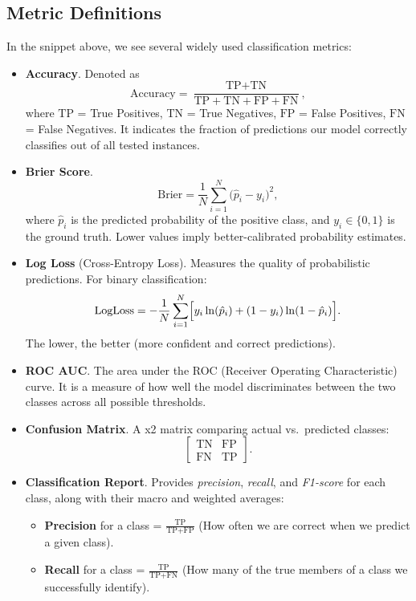 \documentclass[12pt]{article}
\begin{document}
\subsection{Metric Definitions}
In the snippet above, we see several widely used classification metrics:

\begin{itemize}
\item \textbf{Accuracy}. Denoted as
\[
\text{Accuracy} = \frac{\text{TP} + \text{TN}}{\text{TP} + \text{TN} + \text{FP} + \text{FN}},
\]
where \(\text{TP}\) = True Positives, \(\text{TN}\) = True Negatives, \(\text{FP}\) = False Positives, \(\text{FN}\) = False Negatives. It indicates the fraction of predictions our model correctly classifies out of all tested instances.
\item \textbf{Brier Score}. 
\[
\text{Brier} = \frac{1}{N} \sum_{i=1}^N \bigl(\hat{p}_i - y_i\bigr)^2,
\]
where \(\hat{p}_i\) is the predicted probability of the positive class, and \(y_i \in \{0,1\}\) is the ground truth. Lower values imply better-calibrated probability estimates. 
\item \textbf{Log Loss} (Cross-Entropy Loss). Measures the quality of probabilistic predictions. For binary classification:
\[
\text{LogLoss} = -\frac{1}{N}\sum_{i=1}^N \Bigl[y_i\ln(\hat{p}_i) + (1-y_i)\ln(1-\hat{p}_i)\Bigr].
\]
The lower, the better (more confident and correct predictions).
\item \textbf{ROC AUC}. The area under the ROC (Receiver Operating Characteristic) curve. It is a measure of how well the model discriminates between the two classes across all possible thresholds. 
\item \textbf{Confusion Matrix}. A \2x2 matrix comparing actual vs.\ predicted classes: 
\[
\begin{bmatrix}
\text{TN} & \text{FP}\\
\text{FN} & \text{TP}
\end{bmatrix}.
\]
\item \textbf{Classification Report}. Provides \emph{precision}, \emph{recall}, and \emph{F1-score} for each class, along with their macro and weighted averages:
  \begin{itemize}
    \item \textbf{Precision} for a class = 
    \(\frac{\text{TP}}{\text{TP} + \text{FP}}\) (How often we are correct when we predict a given class).
    \item \textbf{Recall} for a class = 
    \(\frac{\text{TP}}{\text{TP} + \text{FN}}\) (How many of the true members of a class we successfully identify).

\end{itemize}
\end{itemize}
\end{document}
